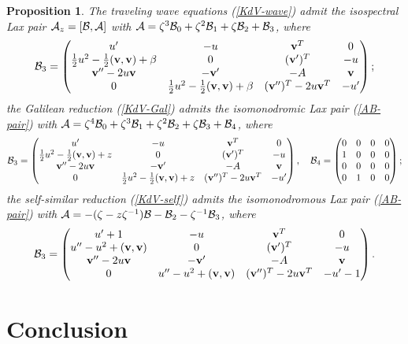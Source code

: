 \documentclass[11pt]{article}
\theoremstyle{plain}
\newtheorem{proposition}{Proposition}
\theoremstyle{definition}
\begin{document}
\begin{proposition}
The traveling wave equations (\ref{KdV-wave}) admit the isospectral Lax pair ${\cal A}_z=[{\cal B},{\cal A}]$ with ${\cal A}=\zeta^3{\cal B}_0+\zeta^2{\cal B}_1+\zeta{\cal B}_2 +{\cal B}_3$, where
\[
 {\cal B}_3=
 \begin{pmatrix}
  u' & -u & {\bf v}^T & 0\\   
  \frac{1}{2}u^2-\frac{1}{2}({\bf v},{\bf v})+\beta & 0 & ({\bf v}')^T & -u\\ 
  {\bf v}''-2u{\bf v} & -{\bf v}' & -A & {\bf v}\\   
  0 & \frac{1}{2}u^2-\frac{1}{2}({\bf v},{\bf v})+\beta & ({\bf v}'')^T-2u{\bf v}^T & -u' 
 \end{pmatrix};
\]
the Galilean reduction (\ref{KdV-Gal}) admits the isomonodromic Lax pair (\ref{AB-pair}) with ${\cal A}=\zeta^4{\cal B}_0+\zeta^3{\cal B}_1+\zeta^2{\cal B}_2 +\zeta{\cal B}_3+{\cal B}_4$, where
\[
 {\cal B}_3=
 \begin{pmatrix}
  u' & -u & {\bf v}^T & 0\\   
  \frac{1}{2}u^2-\frac{1}{2}({\bf v},{\bf v})+z & 0 & ({\bf v}')^T & -u\\ 
  {\bf v}''-2u{\bf v} & -{\bf v}' & -A & {\bf v}\\   
  0 & \frac{1}{2}u^2-\frac{1}{2}({\bf v},{\bf v})+z & ({\bf v}'')^T-2u{\bf v}^T & -u' 
 \end{pmatrix},\quad
 {\cal B}_4=\begin{pmatrix}
   0 & 0 & 0 & 0\\   
   1 & 0 & 0 & 0\\ 
   0 & 0 & 0 & 0\\   
   0 & 1 & 0 & 0 
 \end{pmatrix};
 \]
the self-similar reduction (\ref{KdV-self}) admits the isomonodromous Lax pair (\ref{AB-pair}) with ${\cal A}=-(\zeta-z\zeta^{-1}){\cal B}-{\cal B}_2-\zeta^{-1}{\cal B}_3$, where
\[
 {\cal B}_3=
 \begin{pmatrix}
 u'+1 & -u & {\bf v}^T & 0\\   
 u''-u^2+({\bf v},{\bf v}) & 0 & ({\bf v}')^T & -u\\ 
 {\bf v}''-2u{\bf v} & -{\bf v}' & -A & {\bf v}\\   
 0 & u''-u^2+({\bf v},{\bf v}) & ({\bf v}'')^T-2u{\bf v}^T & -u'-1 
 \end{pmatrix}.
\]
\end{proposition}

\section{Conclusion}
\end{document}
